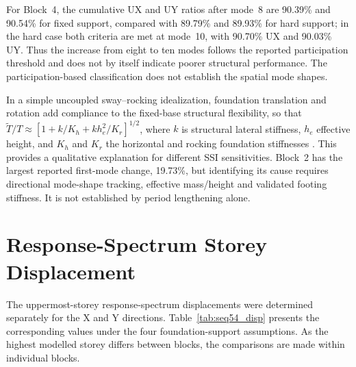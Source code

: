 For Block~4, the cumulative UX and UY ratios after mode~8 are 90.39\% and 90.54\% for fixed support, compared with 89.79\% and 89.93\% for hard support; in the hard case both criteria are met at mode~10, with 90.70\% UX and 90.03\% UY. Thus the increase from eight to ten modes follows the reported participation threshold and does not by itself indicate poorer structural performance. The participation-based classification does not establish the spatial mode shapes.

In a simple uncoupled sway--rocking idealization, foundation translation and rotation add compliance to the fixed-base structural flexibility, so that $\widetilde T/T\approx[1+k/K_h+kh_e^2/K_r]^{1/2}$, where $k$ is structural lateral stiffness, $h_e$ effective height, and $K_h$ and $K_r$ the horizontal and rocking foundation stiffnesses \cite{veletsos1974,nist2012ssi}. This provides a qualitative explanation for different SSI sensitivities. Block~2 has the largest reported first-mode change, 19.73\%, but identifying its cause requires directional mode-shape tracking, effective mass/height and validated footing stiffness. It is not established by period lengthening alone.

\section{Response-Spectrum Storey Displacement}

The uppermost-storey response-spectrum displacements were determined separately for the X and Y directions. Table~\ref{tab:seq54_disp} presents the corresponding values under the four foundation-support assumptions. As the highest modelled storey differs between blocks, the comparisons are made within individual blocks.

